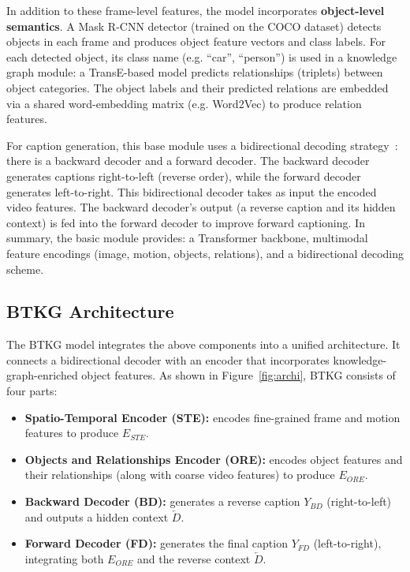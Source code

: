 In addition to these frame-level features, the model incorporates \textbf{object-level semantics}. A Mask R-CNN detector (trained on the COCO dataset) detects objects in each frame and produces object feature vectors and class labels. For each detected object, its class name (e.g. ``car'', ``person'') is used in a knowledge graph module: a TransE-based model predicts relationships (triplets) between object categories. The object labels and their predicted relations are embedded via a shared word-embedding matrix (e.g. Word2Vec) to produce relation features.

For caption generation, this base module uses a bidirectional decoding strategy~\cite{BiTransformer}: there is a backward decoder and a forward decoder. The backward decoder generates captions right-to-left (reverse order), while the forward decoder generates left-to-right. This bidirectional decoder takes as input the encoded video features. The backward decoder's output (a reverse caption and its hidden context) is fed into the forward decoder to improve forward captioning. In summary, the basic module provides: a Transformer backbone, multimodal feature encodings (image, motion, objects, relations), and a bidirectional decoding scheme.

\subsection{BTKG Architecture}

The BTKG model integrates the above components into a unified architecture. It connects a bidirectional decoder with an encoder that incorporates knowledge-graph-enriched object features. As shown in Figure~\ref{fig:archi}, BTKG consists of four parts:

\begin{itemize}[nosep]
    \item \textbf{Spatio-Temporal Encoder (STE):} encodes fine-grained frame and motion features to produce $E_{STE}$.
    
    \item \textbf{Objects and Relationships Encoder (ORE):} encodes object features and their relationships (along with coarse video features) to produce $E_{ORE}$.
    
    \item \textbf{Backward Decoder (BD):} generates a reverse caption $Y_{BD}$ (right-to-left) and outputs a hidden context $\overleftarrow{D}$.
    
    \item \textbf{Forward Decoder (FD):} generates the final caption $Y_{FD}$ (left-to-right), integrating both $E_{ORE}$ and the reverse context $\overleftarrow{D}$.
\end{itemize}

